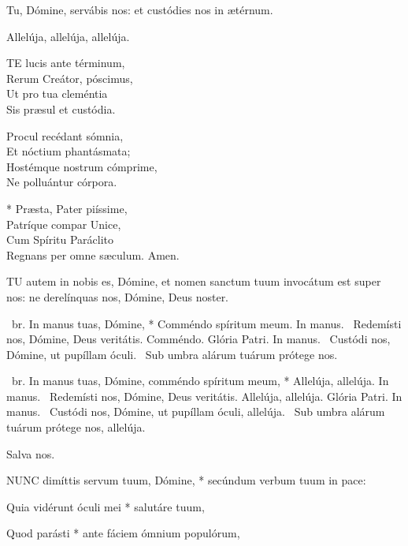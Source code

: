  Tu, Dómine, servábis nos: et custódies nos in ætérnum.


 Allelúja, allelúja, allelúja.


\lettrine[lines=2]{T}{E} lucis ante términum,\\
Rerum Creátor, póscimus,\\
Ut pro tua cleméntia\\
Sis præsul et custódia.

Procul recédant sómnia,\\
Et nóctium phantásmata;\\
Hostémque nostrum cómprime,\\
Ne polluántur córpora.

* Præsta, Pater piíssime,\\
Patríque compar Unice,\\
Cum Spíritu Paráclito\\
Regnans per omne sæculum. Amen.


\lettrine[lines=2]{T}{U} autem in nobis es, Dómine, et nomen sanctum tuum invocátum est super nos: ne derelínquas nos, Dómine, Deus noster.

\R\ br. In manus tuas, Dómine, * Comméndo spíritum meum. In manus. \V\ Redemísti nos, Dómine, Deus veritátis. Comméndo. Glória Patri. In manus. \V\ Custódi nos, Dómine, ut pupíllam óculi. \R\ Sub umbra alárum tuárum prótege nos.



\R\ br. In manus tuas, Dómine, comméndo spíritum meum, * Allelúja, allelúja. In manus. \V\ Redemísti nos, Dómine, Deus veritátis. Allelúja, allelúja. Glória Patri. In manus. \V\ Custódi nos, Dómine, ut pupíllam óculi, allelúja. \R\ Sub umbra alárum tuárum prótege nos, allelúja.

 Salva nos.


\lettrine[lines=2]{N}{UNC} dimíttis servum tuum, Dómine, * secúndum verbum tuum in pace:

Quia vidérunt óculi mei * salutáre tuum,

Quod parásti * ante fáciem ómnium populórum,

